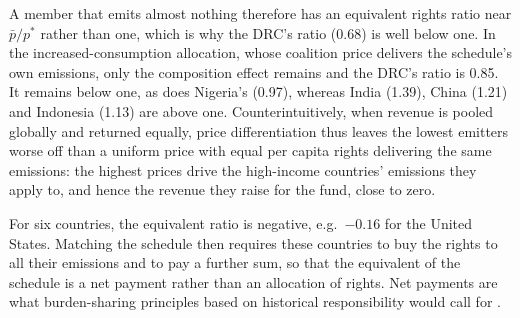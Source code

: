 \documentclass[12pt,english]{article}
\theoremstyle{remark}
\begin{document}
A member that emits almost nothing therefore has an equivalent rights ratio near $\bar p/p^*$ rather than one, which is why the DRC's ratio (0.68) is well below one. In the increased-consumption allocation, whose coalition price delivers the schedule's own emissions, only the composition effect remains and the DRC's ratio is 0.85. It remains below one, as does Nigeria's (0.97), whereas India (1.39), China (1.21) and Indonesia (1.13) are above one. %
Counterintuitively, when revenue is pooled globally and returned equally, price differentiation thus leaves the lowest emitters worse off than a uniform price with equal per capita rights delivering the same emissions: the highest prices drive the high-income countries' emissions they apply to, and hence the revenue they raise for the fund, close to zero.

For six countries, the equivalent ratio is negative, e.g.\ $-0.16$ for the United States. %
Matching the schedule then requires these countries to buy the rights to all their emissions and to pay a further sum, so that the equivalent of the schedule is a net payment rather than an allocation of rights. Net payments are what burden-sharing principles based on historical responsibility would call for \citep{fanning_compensation_2023}. 
\end{document}
